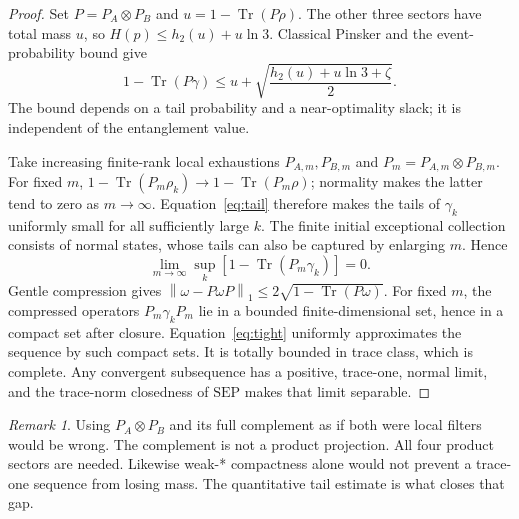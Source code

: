 \documentclass[11pt,a4paper]{article}
\numberwithin{equation}{section}
\theoremstyle{remark}
\newtheorem{remark}[theorem]{Remark}
\newcommand{\tr}{\operatorname{Tr}}
\newcommand{\SEP}{\mathrm{SEP}}
\newcommand{\normone}[1]{\left\|#1\right\|_1}
\newcommand{\hbin}{h_2}
\begin{document}
\begin{proof}
Set \(P=P_A\otimes P_B\) and \(u=1-\tr(P\rho)\). The other three
sectors have total mass \(u\), so \(H(p)\leq\hbin(u)+u\ln3\).
Classical Pinsker and the event-probability bound give
\begin{equation}
 \boxed{
 1-\tr(P\gamma)\leq
 u+\sqrt{\frac{\hbin(u)+u\ln3+\zeta}{2}}.}        \label{eq:tail}
\end{equation}
The bound depends on a tail probability and a near-optimality slack;
it is independent of the entanglement value.

Take increasing finite-rank local exhaustions \(P_{A,m},P_{B,m}\) and
\(P_m=P_{A,m}\otimes P_{B,m}\). For fixed \(m\),
\(1-\tr(P_m\rho_k)\to1-\tr(P_m\rho)\); normality makes the latter tend
to zero as \(m\to\infty\). Equation~\eqref{eq:tail} therefore makes the
tails of \(\gamma_k\) uniformly small for all sufficiently large \(k\).
The finite initial exceptional collection consists of normal states,
whose tails can also be captured by enlarging \(m\). Hence
\begin{equation}
 \lim_{m\to\infty}\sup_k[1-\tr(P_m\gamma_k)]=0.   \label{eq:tight}
\end{equation}
Gentle compression gives
\(\normone{\omega-P\omega P}\leq2\sqrt{1-\tr(P\omega)}\).
For fixed \(m\), the compressed operators \(P_m\gamma_kP_m\) lie in a
bounded finite-dimensional set, hence in a compact set after closure.
Equation~\eqref{eq:tight} uniformly approximates the sequence by such
compact sets. It is totally bounded in trace class, which is complete.
Any convergent subsequence has a positive, trace-one, normal limit, and
the trace-norm closedness of \(\SEP\) makes that limit separable.
\end{proof}

\begin{remark}
Using \(P_A\otimes P_B\) and its full complement as if both were local
filters would be wrong. The complement is not a product projection.
All four product sectors are needed. Likewise weak-* compactness alone
would not prevent a trace-one sequence from losing mass. The quantitative
tail estimate is what closes that gap.
\end{remark}
\end{document}
